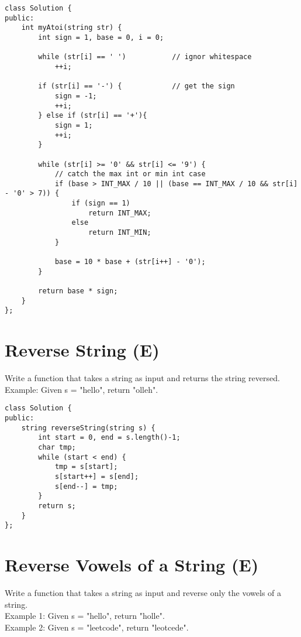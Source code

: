 \begin{lstlisting}
class Solution {
public:
    int myAtoi(string str) {
        int sign = 1, base = 0, i = 0;
        
        while (str[i] == ' ')           // ignor whitespace
            ++i;
        
        if (str[i] == '-') {            // get the sign
            sign = -1;
            ++i;
        } else if (str[i] == '+'){
            sign = 1;
            ++i;
        }
        
        while (str[i] >= '0' && str[i] <= '9') {
            // catch the max int or min int case
            if (base > INT_MAX / 10 || (base == INT_MAX / 10 && str[i] - '0' > 7)) {
                if (sign == 1) 
                    return INT_MAX;
                else 
                    return INT_MIN;
            }
            
            base = 10 * base + (str[i++] - '0');
        }
        
        return base * sign;
    }
};
\end{lstlisting}  


\section{Reverse String (E)}
Write a function that takes a string as input and returns the string reversed. \\

Example: Given s = "hello", return "olleh". \\

\begin{lstlisting}
class Solution {
public:
    string reverseString(string s) {
        int start = 0, end = s.length()-1;
        char tmp;
        while (start < end) {
            tmp = s[start];
            s[start++] = s[end];
            s[end--] = tmp;
        }
        return s;
    }
};
\end{lstlisting}


\section{Reverse Vowels of a String (E)}
Write a function that takes a string as input and reverse only the vowels of a string. \\

Example 1:
Given s = "hello", return "holle". \\

Example 2:
Given s = "leetcode", return "leotcede". \\

